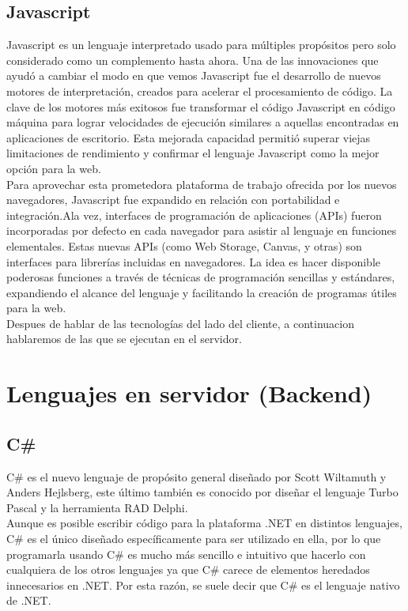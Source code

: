 \subsection{Javascript}

Javascript es un lenguaje interpretado usado para m\'ultiples prop\'ositos pero solo considerado como un complemento hasta ahora. Una de las innovaciones que ayud\'o a cambiar el modo en que vemos Javascript fue el desarrollo de nuevos motores de interpretaci\'on, creados para acelerar el procesamiento de c\'odigo. La clave de los motores m\'as exitosos fue transformar el c\'odigo Javascript en c\'odigo m\'aquina para lograr velocidades de ejecuci\'on similares a aquellas encontradas en aplicaciones de escritorio. Esta mejorada capacidad permiti\'o superar viejas limitaciones de rendimiento y confirmar el lenguaje Javascript como la mejor opci\'on para la web.\\

Para aprovechar esta prometedora plataforma de trabajo ofrecida por los nuevos navegadores, Javascript fue expandido en relaci\'on con portabilidad e integraci\'on.Ala vez, interfaces de programaci\'on de aplicaciones (APIs) fueron incorporadas por defecto en cada navegador para asistir al lenguaje en funciones elementales. Estas nuevas APIs (como Web Storage, Canvas, y otras) son interfaces para librer\'ias incluidas en navegadores. La idea es hacer disponible poderosas funciones a trav\'es de t\'ecnicas de programaci\'on sencillas y est\'andares, expandiendo el alcance del lenguaje y facilitando la creaci\'on de programas \'utiles para la web.\\


Despues de hablar de las tecnolog\'ias del lado del cliente, a continuacion hablaremos de las que se ejecutan en el servidor.

\section{Lenguajes en servidor (Backend)}
\subsection{C\#}

C\# es el nuevo lenguaje de prop\'osito general dise\~nado por Scott Wiltamuth y Anders Hejlsberg, este \'ultimo tambi\'en es conocido por dise\~nar el lenguaje Turbo Pascal y la herramienta RAD Delphi.\\

Aunque es posible escribir c\'odigo para la plataforma .NET en distintos lenguajes, C\# es el \'unico dise\~nado espec\'ificamente para ser utilizado en ella, por lo que programarla usando C\# es mucho m\'as sencillo e intuitivo que hacerlo con cualquiera de los otros lenguajes ya que C\# carece de elementos heredados innecesarios en .NET. Por esta raz\'on, se suele decir que C\# es el lenguaje nativo de .NET.\\

